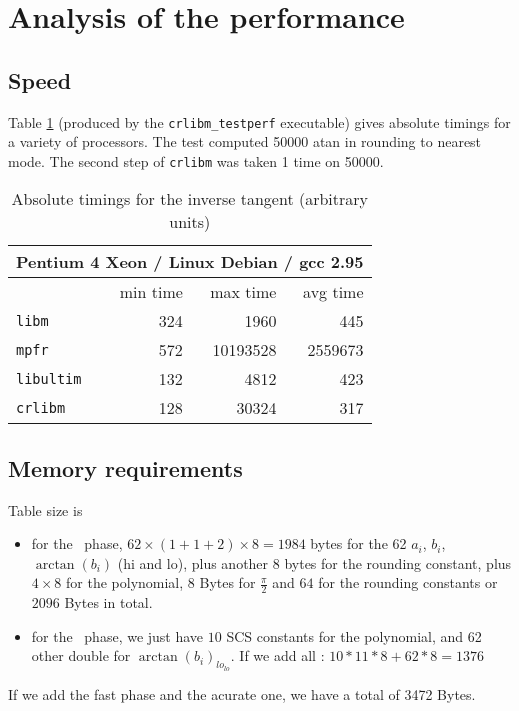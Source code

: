 \section{Analysis of the performance}

\subsection{Speed}
Table \ref{tbl:arctan_abstime} (produced by the \texttt{crlibm\_testperf}
executable) gives absolute timings for a variety of processors. The test
computed 50000 atan in rounding to nearest mode. The second step of
\texttt{crlibm} was taken 1 time on 50000.

\begin{table}[!htb]
\begin{center}
\renewcommand{\arraystretch}{1.2}
\begin{tabular}{|l|r|r|r|}
\hline
\hline

 \multicolumn{4}{|c|}{Pentium 4 Xeon / Linux Debian / gcc 2.95}   \\
 \hline
                         & min time      & max time      & avg time \\ 
 \hline
 \texttt{libm}           & 324          & 1960          &        445 \\ 
 \hline
  \texttt{mpfr}          & 572          & 10193528      &    2559673 \\ 
 \hline
  \texttt{libultim}      & 132          & 4812          &        423 \\ 
 \hline
 \texttt{crlibm}         & 128          & 30324         &        317 \\ 
 \hline

\end{tabular}
\end{center}
\caption{Absolute timings for the inverse tangent (arbitrary units)
  \label{tbl:arctan_abstime}}
\end{table}

\subsection{Memory requirements}
Table size is
\begin{itemize}
\item for the \quick\ phase,
  $62\times (1+1+2) \times8=1984$ bytes for the 62 $a_i$, $b_i$,
  $\arctan(b_i)$ (hi and lo), plus another $8$ bytes for the rounding
  constant, plus $4\times8$ for the polynomial, $8$ Bytes for
  $\frac{\pi}{2}$ and $64$ for the rounding constants or $2096$ Bytes in
  total.
  
\item for the \accurate\ phase, we just have $10$ SCS constants for the
  polynomial, and 62 other double for $\arctan(b_i)_{lo_{lo}}$.
  If we add all : $10*11*8 + 62*8 = 1376$
\end{itemize}
If we add the fast phase and the acurate one, we have a total of 3472
Bytes.



